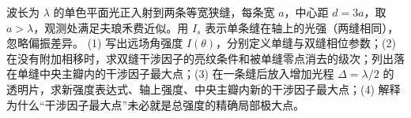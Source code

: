 波长为 \(\lambda\) 的单色平面光正入射到两条等宽狭缝，每条宽 \(a\)，中心距 \(d=3a\)，取 \(a>\lambda\)，观测处满足夫琅禾费近似。用 \(I_s\) 表示单条缝在轴上的光强（两缝相同），忽略偏振差异。
(1) 写出远场角强度 \(I(\theta)\)，分别定义单缝与双缝相位参数；(2) 在没有附加相移时，求双缝干涉因子的亮纹条件和被单缝零点消去的级次；列出落在单缝中央主瓣内的干涉因子最大点；(3) 在一条缝后放入增加光程 \(\Delta=\lambda/2\) 的透明片，求新强度表达式、轴上强度、中央主瓣内新的干涉因子最大点；(4) 解释为什么“干涉因子最大点”未必就是总强度的精确局部极大点。

